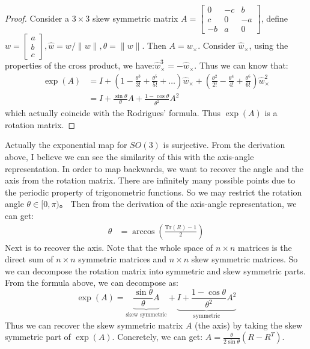 \documentclass[
]{book}
\theoremstyle{definition}
\theoremstyle{definition}
\theoremstyle{definition}
\theoremstyle{definition}
\theoremstyle{remark}
\begin{document}
\begin{proof}
Consider a \(3\times 3\) skew symmetric matrix \(A = \begin{bmatrix} 0 &-c &b\\c &0 &-a\\-b &a &0 \end{bmatrix}\), define \(w = \begin{bmatrix} a\\b\\c \end{bmatrix}, \hat{w} = w/\|w\|, \theta=\|w\|\). Then \(A = w_\times\). Consider \(\hat{w}_\times\), using the properties of the cross product, we have:\(\hat{w}^3_\times = -\hat{w}_\times\). Thus we can know that:
\begin{align}
    \exp(A) &= I + (1-\frac{\theta^3}{3!}+\frac{\theta^5}{5!}+\dots)\hat{w}_\times + (\frac{\theta^2}{2!}-\frac{\theta^4}{4!}+\frac{\theta^6}{6!})\hat{w}_\times^2\\
    &= I + \frac{\sin\theta}{\theta}A + \frac{1-\cos\theta}{\theta^2}A^2
  \end{align}
which actually coincide with the Rodrigues' formula. Thus \(\exp(A)\) is a rotation matrix.
\end{proof}

Actually the exponential map for \(SO(3)\) is surjective. From the derivation above, I believe we can see the similarity of this with the axis-angle representation. In order to map backwards, we want to recover the angle and the axis from the rotation matrix. There are infinitely many possible points due to the periodic property of trigonometric functions. So we may restrict the rotation angle \(\theta \in [0,\pi)\)。 Then from the derivation of the axis-angle representation, we can get:
\begin{align}
  \theta &= \arccos(\frac{\text{Tr}(R) - 1}{2})
\end{align}
Next is to recover the axis. Note that the whole space of \(n\times n\) matrices is the direct sum of \(n\times n\) symmetric matrices and \(n\times n\) skew symmetric matrices. So we can decompose the rotation matrix into symmetric and skew symmetric parts. From the formula above, we can decompose as:
\[ \exp(A) = \underbrace{\frac{\sin\theta}{\theta}A}_{\text{skew symmetric}} + \underbrace{I + \frac{1-\cos\theta}{\theta^2}A^2}_{\text{symmetric}}
\]
Thus we can recover the skew symmetric matrix \(A\) (the axis) by taking the skew symmetric part of \(\exp(A)\). Concretely, we can get: \(A = \frac{\theta}{2\sin\theta}(R - R^T)\).
\end{document}
